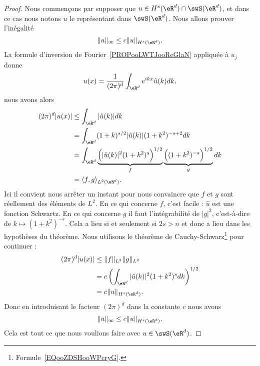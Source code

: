 \begin{proof}
    Nous commençons par supposer que \( u\in H^s(\eR^d)\cap \swS(\eR^d)\), et dans ce cas nous notons \( u\) le représentant dans \( \swS(\eR^d)\). Nous allons prouver l'inégalité
    \begin{equation}
        \| u \|_{\infty}\leq c\| u \|_{H^s(\eR^d)}.
    \end{equation}
    La formule d'inversion de Fourier~\ref{PROPooLWTJooReGlaN} appliquée à \( u_j\) donne
    \begin{equation}        \label{EQooDKYDooAxThqf}
        u(x)=\frac{1}{ (2\pi)^d }\int_{\eR^d} e^{ikx}\hat u(k)dk,
    \end{equation}
    nous avons alors
    \begin{subequations}
        \begin{align}
            (2\pi)^d| u(x) |&\leq\int_{\eR^d}| \hat u(k) |dk\\
            &=\int_{\eR^d}(1+k)^{s/2}| \hat u(k) |(1+k^2)^{-s+2}dk\\
            &=\int_{\eR^d}\underbrace{\Big( | \hat u(k) |^2(1+k^2)^s \Big)^{1/2}}_{f}\underbrace{\Big( (1+k^2)^{-s} \Big)^{1/2}}_{g}dk\\
            &=\langle f, g\rangle_{L^2(\eR^d)}.
        \end{align}
    \end{subequations}
    Ici il convient nous arrêter un instant pour nous convaincre que \( f\) et \( g\) sont réellement des éléments de \( L^2\). En ce qui concerne \( f\), c'est facile : \( \hat u\) est une fonction Schwartz. En ce qui concerne \( g\) il faut l'intégrabilité de \( | g |^2\), c'est-à-dire de \( k\mapsto (1+k^2)^{-s}\). Cela a lieu si et seulement si \(2s>n\) et donc a lieu dans les hypothèses du théorème. Nous utilisons le théorème de Cauchy-Schwarz\footnote{Formule~\ref{EQooZDSHooWPcryG}.} pour continuer :
    \begin{subequations}
        \begin{align}
            (2\pi)^d| u(x) |&\leq \| f \|_{L^2}\| g \|_{L^2}\\
            &=c\left( \int_{\eR^d}| \hat u(k) |^2(1+k^2)^sdk \right)^{1/2}\\
            &=c\| u \|_{H^s(\eR^d)}.
        \end{align}
    \end{subequations}
    Donc en introduisant le facteur \( (2\pi)^d\) dans la constante \( c\) nous avons
    \begin{equation}
        \| u \|_{\infty}\leq c\| u \|_{H^s(\eR^d)}.
    \end{equation}
    Cela est tout ce que nous voulions faire avec \( u\in \swS(\eR^d)\).


\end{proof}
